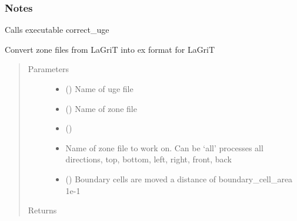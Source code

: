 \documentclass[letterpaper,10pt,english]{sphinxmanual}
\begin{document}
\begin{fulllineitems}
\begin{fulllineitems}
\subsubsection*{Notes}

Calls executable correct\_uge

\end{fulllineitems}


\begin{fulllineitems}
\label{\detokenize{pydfnworks:pydfnworks.general.dfnworks.DFNWORKS.zone2ex}}
Convert zone files from LaGriT into ex format for LaGriT
\begin{quote}\begin{description}
\item[{Parameters}] \leavevmode\begin{itemize}
\item {} 
 () \textendash{} Name of uge file

\item {} 
 () \textendash{} Name of zone file

\item {} 
 () \textendash{} 

\item {} 
 \textendash{} Name of zone file to work on. Can be ‘all’ processes all directions, top, bottom, left, right, front, back

\item {} 
 () \textendash{} Boundary cells are moved a distance of boundary\_cell\_area 1e-1

\end{itemize}

\item[{Returns}] \leavevmode



\end{description}
\end{quote}
\end{fulllineitems}
\end{fulllineitems}
\end{document}
